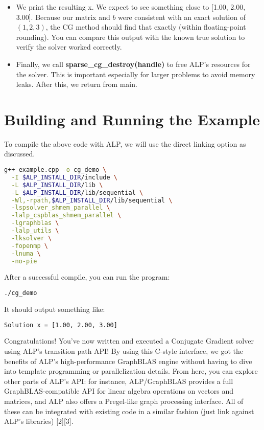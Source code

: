 \begin{itemize}
    \item We print the resulting x. We expect to see something close to [1.00, 2.00, 3.00]. Because our matrix and $b$ were consistent with an exact solution of $(1,2,3)$, the CG method should find that exactly (within floating-point rounding). You can compare this output with the known true solution to verify the solver worked correctly.
    
    \item Finally, we call \textbf{sparse\_cg\_destroy(handle)} to free ALP’s resources for the solver. This is important especially for larger problems to avoid memory leaks. After this, we return from main.
    
\end{itemize}



\section*{Building and Running the Example}
To compile the above code with ALP, we will use the direct linking option as discussed. 
\begin{lstlisting}[language=bash, basicstyle=\ttfamily\small, showstringspaces=false]
g++ example.cpp -o cg_demo \
  -I $ALP_INSTALL_DIR/include \
  -L $ALP_INSTALL_DIR/lib \
  -L $ALP_INSTALL_DIR/lib/sequential \
  -Wl,-rpath,$ALP_INSTALL_DIR/lib/sequential \
  -lspsolver_shmem_parallel \
  -lalp_cspblas_shmem_parallel \
  -lgraphblas \
  -lalp_utils \
  -lksolver \
  -fopenmp \
  -lnuma \
  -no-pie
\end{lstlisting}
After a successful compile, you can run the program:
    \begin{lstlisting}[language=bash]
    ./cg_demo
    \end{lstlisting}
It should output something like:
    \begin{lstlisting}[language=bash]
    Solution x = [1.00, 2.00, 3.00]
    \end{lstlisting}



Congratulations! You’ve now written and executed a Conjugate Gradient solver using ALP’s transition path
API! By using this C-style interface, we got the benefits of ALP’s high-performance GraphBLAS engine
without having to dive into template programming or parallelization details. From here, you can explore
other parts of ALP’s API: for instance, ALP/GraphBLAS provides a full GraphBLAS-compatible API for linear
algebra operations on vectors and matrices, and ALP also offers a Pregel-like graph processing interface. All
of these can be integrated with existing code in a similar fashion (just link against ALP’s libraries) [2][3].


